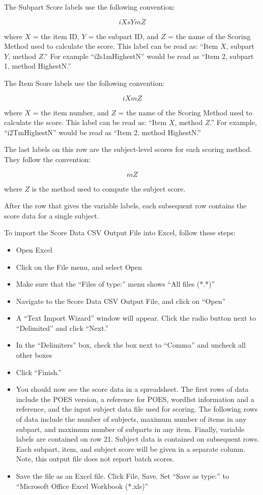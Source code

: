 \documentclass[11pt]{article}
\numberwithin{figure}{section}
\numberwithin{table}{section}
\begin{document}
The Subpart Score labels use the following convention:

\[iXsYmZ\]

where $X$ = the item ID, $Y$ = the subpart ID, and $Z$ = the name of the Scoring Method used to calculate the score.  This label can be read as: ``Item $X$, subpart $Y$, method $Z$.''  For example ``i2s1mHighestN'' would be read as ``Item 2, subpart 1, method HighestN.'' 

The Item Score labels use the following convention:

\[iXmZ\]

where $X$ = the item number, and $Z$ = the name of the Scoring Method used to calculate the score.  This label can be read as: ``Item $X$, method $Z$.''  For example, ``i2TmHighestN'' would be read as ``Item 2, method HighestN.''

The last labels on this row are the subject-level scores for each scoring method.  They follow the convention:

\[mZ\]

where $Z$ is the method used to compute the subject score.

After the row that gives the variable labels, each subsequent row contains the score data for a single subject.  


To import the Score Data CSV Output File into Excel, follow these steps:
\begin{itemize}
\item[] Open Excel
\item[] Click on the File menu, and select Open
\item[] Make sure that the ``Files of type:'' menu shows ``All files (*.*)''
\item[] Navigate to the Score Data CSV Output File, and click on ``Open''
\item[] A ``Text Import Wizard'' window will appear.  Click the radio button next to ``Delimited'' and click ``Next.''
\item[] In the ``Delimiters'' box, check the box next to ``Comma'' and uncheck all other boxes
\item[] Click ``Finish.''
\item[] You should now see the score data in a spreadsheet.  The first rows of data include the POES version, a reference for POES, wordlist information and a reference, and the input subject data file used for scoring.  The following rows of data include the number of subjects, maximum number of items in any subpart, and maximum number of subparts in any item.  Finally, variable labels are contained on row 21.  Subject data is contained on subsequent rows.  Each subpart, item, and subject score will be given in a separate column.  Note, this output file does not report batch scores.
\item[] Save the file as an Excel file.  Click File, Save.  Set ``Save as type:'' to ``Microsoft Office Excel Workbook (*.xls)''
\end{itemize}
\end{document}
